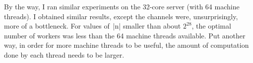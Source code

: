 By the way, I ran similar experiments on the 32-core server (with 64 machine
threads).  I obtained similar results, except the channels were,
unsurprisingly, more of a bottleneck.  For values of~|n| smaller than about
$2^{28}$, the optimal number of workers was less than the 64 machine threads
available.  Put another way, in order for more machine threads to be useful,
the amount of computation done by each thread needs to be larger. 






